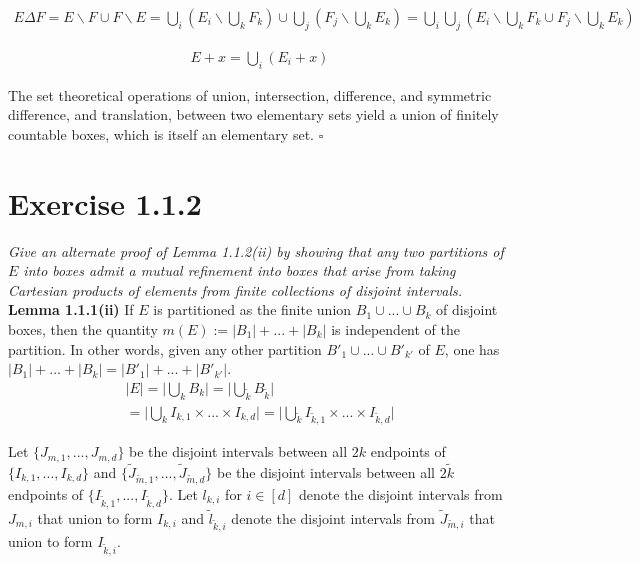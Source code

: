 \documentclass[12pt,letterpaper]{article}
\begin{document}
\begin{equation}
   \begin{aligned}
      E \Delta F = E \backslash F \cup F \backslash E
      = \bigcup_i \left( E_i \backslash \bigcup_k F_k \right) \cup \bigcup_j \left( F_j \backslash \bigcup_k E_k \right) 
      = \bigcup_i \bigcup_j \left( E_i \backslash \bigcup_k F_k \cup F_j \backslash \bigcup_k E_k \right)
   \end{aligned}
\end{equation}

\begin{equation}
   \begin{aligned}
      E + x = \bigcup_i \left( E_i + x \right)
   \end{aligned}
\end{equation}

The set theoretical operations of union, intersection, difference, and symmetric difference, and translation, 
between two elementary sets yield a union of finitely countable boxes, which is itself an elementary set. $\square$

\section{Exercise 1.1.2}

\textit{Give an alternate proof of Lemma 1.1.2(ii) by showing that any two partitions of $E$ into boxes admit a mutual refinement
into boxes that arise from taking Cartesian products of elements from
finite collections of disjoint intervals.}
\\
\textbf{Lemma 1.1.1(ii)}
If $E$ is partitioned as the finite union $B_1 \cup ... \cup B_k$ of disjoint
boxes, then the quantity $m(E) := |B_1| + ... + |B_k|$ is independent of the partition. In other words, given any other
partition $B'_1 \cup ... \cup B'_{k'}$ of $E$, one has $|B_1| + ... + |B_k| = |B'_1| + ... + |B'_{k'}|$.
\\
\begin{equation}
   \begin{aligned}
      \lvert E \rvert = \lvert \bigcup_k B_k \rvert = \lvert \bigcup_{\tilde{k}} B_{\tilde{k}} \rvert \\
      = \lvert \bigcup_k I_{k,1} \times ... \times I_{k,d} \rvert = \lvert \bigcup_{\tilde{k}} I_{\tilde{k},1} \times ... \times I_{\tilde{k},d} \rvert
   \end{aligned}
\end{equation}

Let $\{ J_{m,1}, ..., J_{m,d} \}$ be the disjoint intervals between all $2k$ endpoints of $\{ I_{k,1}, ..., I_{k,d} \}$ and 
$\{ \tilde{J}_{\tilde{m},1}, ..., \tilde{J}_{\tilde{m},d} \}$ be the disjoint intervals between all $2\tilde{k}$
endpoints of $\{ I_{\tilde{k},1}, ..., I_{\tilde{k},d} \}$.
Let $l_{k, i}$ for $i \in [d]$ denote the disjoint intervals from $J_{m,i}$ that union to form $I_{k,i}$
and $\tilde{l}_{\tilde{k}, i}$ denote the disjoint intervals from $\tilde{J}_{\tilde{m},i}$ that union to form $I_{\tilde{k},i}$.
\end{document}
